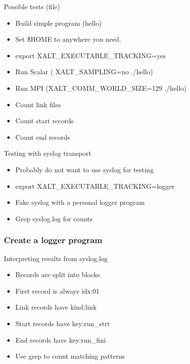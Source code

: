 \documentclass{beamer}
\begin{document}
\begin{frame}{Possible tests (file)}
  \begin{itemize}
    \item Build simple program (hello)
    \item Set \$HOME to anywhere you need.
    \item export XALT_EXECUTABLE_TRACKING=yes
    \item Run Scalar ( XALT_SAMPLING=no ./hello)
    \item Run MPI (XALT_COMM_WORLD_SIZE=129 ./hello)
    \item Count link files
    \item Count start records
    \item Count end records
  \end{itemize}
\end{frame}

\begin{frame}{Testing with syslog transport}
  \begin{itemize}
    \item Probably do not want to use syslog for testing
    \item export XALT_EXECUTABLE_TRACKING=logger
    \item Fake syslog with a personal logger program
    \item Grep syslog.log for counts
  \end{itemize}
\end{frame}

\begin{frame}[fragile]
    \frametitle{Create a logger program}
 {\small
}
\end{frame}

\begin{frame}{Interpreting results from syslog.log}
  \begin{itemize}
    \item Records are split into blocks
    \item First record is always idx:01
    \item Link records have kind:link
    \item Start records have key:run_strt
    \item End records have key:run_fini
    \item Use grep to count matching patterns
  \end{itemize}
\end{frame}
\end{document}
